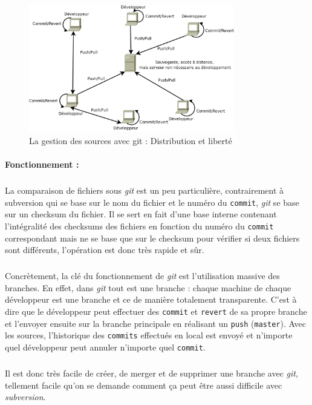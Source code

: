 \begin{figure}[H]
\begin{center}
        \includegraphics[width=0.8\textwidth]{./schema/git.png}
\caption{La gestion des sources avec git : Distribution et liberté}
\label{git}
\end{center}
\end{figure}

\paragraph{Fonctionnement :} 
\subparagraph{}
La comparaison de fichiers sous \textit{git} est un peu particulière, contrairement à subversion qui se base sur le nom du fichier et le numéro du \verb|commit|, \textit{git} se base sur un checksum du fichier. Il se sert en fait d'une base interne contenant l'intégralité des checksums des fichiers en fonction du numéro du \verb|commit| correspondant mais ne se base que sur le checksum pour vérifier si deux fichiers sont différents, l'opération est donc très rapide et sûr.

\subparagraph{}
Concrètement, la clé du fonctionnement de \textit{git} est l'utilisation massive des branches. En effet, dans \textit{git} tout est une branche : chaque machine de chaque développeur est une branche et ce de manière totalement transparente. C'est à dire que le développeur peut effectuer des \verb|commit| et \verb|revert| de sa propre branche et l'envoyer ensuite sur la branche principale en r\'ealisant un \verb|push| (\verb|master|). Avec les sources, l'historique des \verb|commits| effectués en local est envoyé et n'importe quel développeur peut annuler n'importe quel \verb|commit|.

\subparagraph{}
Il est donc très facile de créer, de merger et de supprimer une branche avec \textit{git}, tellement facile qu'on se demande comment ça peut être aussi difficile avec \textit{subversion}.

